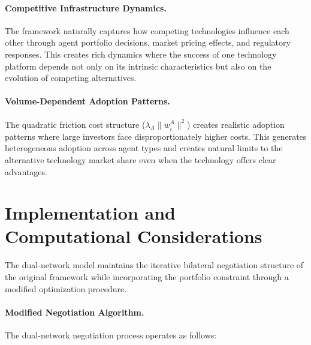 \paragraph{Competitive Infrastructure Dynamics.} The framework naturally captures how competing technologies influence each other through agent portfolio decisions, market pricing effects, and regulatory responses. This creates rich dynamics where the success of one technology platform depends not only on its intrinsic characteristics but also on the evolution of competing alternatives.

\paragraph{Volume-Dependent Adoption Patterns.} The quadratic friction cost structure ($\lambda_A\|w_i^A\|^2$) creates realistic adoption patterns where large investors face disproportionately higher costs. This generates heterogeneous adoption across agent types and creates natural limits to the alternative technology market share even when the technology offers clear advantages.



\section{Implementation and Computational Considerations}

The dual-network model maintains the iterative bilateral negotiation structure of the original framework while incorporating the portfolio constraint through a modified optimization procedure.

\paragraph{Modified Negotiation Algorithm.} The dual-network negotiation process operates as follows:

